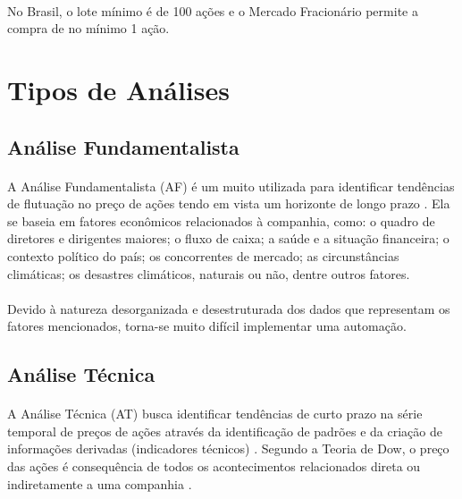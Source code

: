 \paragraph{} No Brasil, o lote mínimo é de 100 ações e o Mercado Fracionário permite a compra de no mínimo 1 ação.

\section{Tipos de Análises}

\subsection{Análise Fundamentalista}
\label{subsection:af}

\paragraph{} A Análise Fundamentalista (AF) é um muito utilizada para identificar tendências de flutuação no preço de ações tendo em vista um horizonte de longo prazo \cite{bulkowski2012fundamental}. Ela se baseia em fatores econômicos relacionados à companhia, como: o quadro de diretores e dirigentes maiores; o fluxo de caixa; a saúde e a situação financeira; o contexto político do país; os concorrentes de mercado; as circunstâncias climáticas; os desastres climáticos, naturais ou não, dentre outros fatores.

\paragraph{} Devido à natureza desorganizada e desestruturada dos dados que representam os fatores mencionados, torna-se muito difícil implementar uma automação.

\subsection{Análise Técnica}
\label{subsection:at}

\paragraph{} A Análise Técnica (AT) busca identificar tendências de curto prazo na série temporal de preços de ações através da identificação de padrões e da criação de informações derivadas (indicadores técnicos) \cite{murphy1999technical, edwards2018technical}. Segundo a Teoria de Dow, o preço das ações é consequência de todos os acontecimentos relacionados direta ou indiretamente a uma companhia \cite{kirkpatrick2010technical}.

